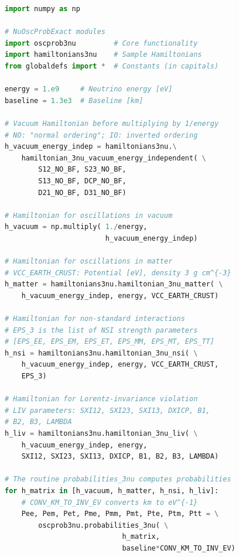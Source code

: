 \documentclass[final,5p,times,twocolumn]{elsarticle}
\begin{document}
\begin{lstlisting}[language=Python, caption={Code snippet to use {\tt NuOscProbExact} to compute three-neutrino oscillation probabilities in vacuum, matter of constant density, with non-standard interactions, and with CPT-odd Lorentz-violating background, for fixed neutrino energy $E = 1$~GeV and baseline $L = 1300$~km.  Constants --- with variable names in capitals --- are pulled from the {\tt globaldefs} module; see the main text for their values.}, label={lst:3nu_examples}, float]
import numpy as np

# NuOscProbExact modules
import oscprob3nu         # Core functionality
import hamiltonians3nu    # Sample Hamiltonians
from globaldefs import *  # Constants (in capitals)

energy = 1.e9     # Neutrino energy [eV]
baseline = 1.3e3  # Baseline [km]

# Vacuum Hamiltonian before multiplying by 1/energy
# NO: "normal ordering"; IO: inverted ordering
h_vacuum_energy_indep = hamiltonians3nu.\
    hamiltonian_3nu_vacuum_energy_independent( \
        S12_NO_BF, S23_NO_BF,
        S13_NO_BF, DCP_NO_BF,
        D21_NO_BF, D31_NO_BF)

# Hamiltonian for oscillations in vacuum
h_vacuum = np.multiply( 1./energy, 
                        h_vacuum_energy_indep)

# Hamiltonian for oscillations in matter                        
# VCC_EARTH_CRUST: Potential [eV], density 3 g cm^{-3}
h_matter = hamiltonians3nu.hamiltonian_3nu_matter( \
    h_vacuum_energy_indep, energy, VCC_EARTH_CRUST)

# Hamiltonian for non-standard interactions
# EPS_3 is the list of NSI strength parameters
# [EPS_EE, EPS_EM, EPS_ET, EPS_MM, EPS_MT, EPS_TT]
h_nsi = hamiltonians3nu.hamiltonian_3nu_nsi( \
    h_vacuum_energy_indep, energy, VCC_EARTH_CRUST, 
    EPS_3)

# Hamiltonian for Lorentz-invariance violation
# LIV parameters: SXI12, SXI23, SXI13, DXICP, B1,
# B2, B3, LAMBDA
h_liv = hamiltonians3nu.hamiltonian_3nu_liv( \
    h_vacuum_energy_indep, energy,
    SXI12, SXI23, SXI13, DXICP, B1, B2, B3, LAMBDA)

# The routine probabilities_3nu computes probabilities
for h_matrix in [h_vacuum, h_matter, h_nsi, h_liv]:
    # CONV_KM_TO_INV_EV converts km to eV^{-1}
    Pee, Pem, Pet, Pme, Pmm, Pmt, Pte, Ptm, Ptt = \
        oscprob3nu.probabilities_3nu( \
                            h_matrix,
                            baseline*CONV_KM_TO_INV_EV)


\end{lstlisting}
\end{document}
